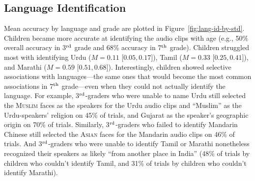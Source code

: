 \documentclass{foushee-adapted-preprint}
\begin{document}
\subsection{Language Identification}
Mean accuracy by language and grade are plotted in Figure~\ref{fig:lang-id-by-std}. 
Children became more accurate at identifying the audio clips with age (e.g., 50\% overall accuracy in 3$^{\textnormal{rd}}$ grade and 68\% accuracy in 7$^{\textnormal{th}}$ grade). Children struggled most with identifying Urdu ($M=0.11$ [$0.05, 0.17]$), Tamil ($M=0.33$ [$0.25, 0.41]$), and Marathi ($M=0.59$ [$0.51, 0.68]$). 
Interestingly, children showed selective associations with languages---the same ones that would become the most common associations in 7$^{\textnormal{th}}$ grade---even when they could not actually identify the language. 
For example, 3$^{\textnormal{rd}}$-graders who were unable to name Urdu still selected the \textsc{Muslim} faces as the speakers for the Urdu audio clips and ``Muslim'' as the Urdu-speakers' religion on 45\% of trials, and Gujarat as the speaker's geographic origin on 70\% of trials. 
Similarly, 3$^{\textnormal{rd}}$-graders who failed to identify Mandarin Chinese still selected the \textsc{Asian} faces for the Mandarin audio clips on 46\% of trials. %
And 3$^{\textnormal{rd}}$-graders who were unable to identify Tamil or Marathi nonetheless recognized their speakers as likely ``from another place in India'' (48\% of trials by children who couldn't identify Tamil, and 31\% of trials by children who couldn't identify Marathi).  %
\end{document}
